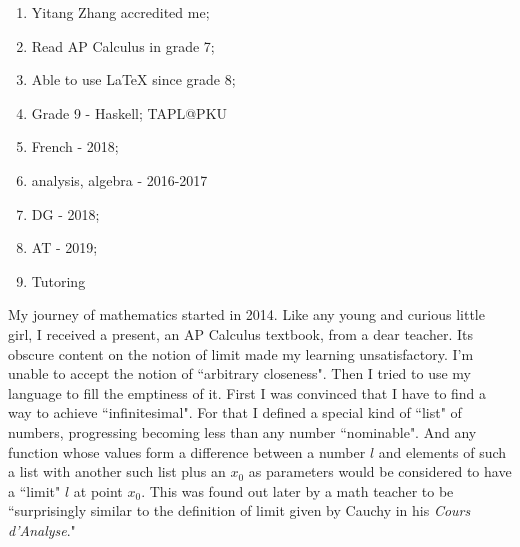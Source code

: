\documentclass[10pt]{article}
\begin{document}
\begin{CJK*}{UTF8}{gbsn}
\noindent\makebox[\linewidth]{\rule{\paperwidth}{0.4pt}}

\begin{enumerate}
\item Yitang Zhang accredited me;
\item Read AP Calculus in grade 7;
\item Able to use {\LaTeX} since grade 8;
\item Grade 9 - Haskell; TAPL@PKU
\item French - 2018;
\item analysis, algebra - 2016-2017
\item DG - 2018;
\item AT - 2019;
\item Tutoring
\end{enumerate}

\newpage
My journey of mathematics started in 2014. Like any young and curious little girl, I received a present, an AP Calculus textbook, from a dear teacher. Its obscure content on the notion of limit made my learning unsatisfactory. I'm unable to accept the notion of ``arbitrary closeness". Then I tried to use my language to fill the emptiness of it. First I was convinced that I have to find a way to achieve ``infinitesimal". For that I defined a special kind of ``list" of numbers, progressing becoming less than any number ``nominable". And any function whose values form a difference between a number $l$ and elements of such a list with another such list plus an $x_0$ as parameters would be considered to have a ``limit" $l$ at point $x_0$. This was found out later by a math teacher to be ``surprisingly similar to the definition of limit given by Cauchy in his \textit{Cours d'Analyse}."


\end{CJK*}
\end{document}
